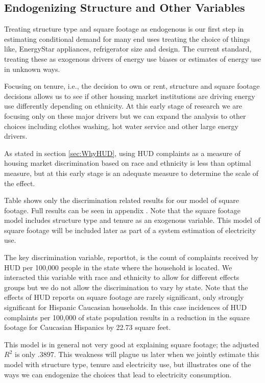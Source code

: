 \documentclass{article}
\begin{document}
\subsection{Endogenizing Structure and Other Variables}\label{sec:SingleEq}

Treating structure type and square footage as endogenous is our first step in estimating conditional demand for many end uses treating the choice of things like, EnergyStar appliances, refrigerator size and design.  The current standard, treating these as exogenous drivers of energy use biases or estimates of energy use in unknown ways.

Focusing on tenure, i.e., the decision to own or rent, structure and square footage decisions allows us to see if other housing market institutions are driving energy use differently depending on ethnicity.  At this early stage of research we are focusing only on these major drivers but we can expand the analysis to other choices including clothes washing, hot water service and other large energy drivers.

As stated in section \ref{sec:WhyHUD}, using HUD complaints as a measure of housing market discrimination based on race and ethnicity is less than optimal measure, but at this early stage is an adequate measure to determine the scale of the effect.  


Table 
shows only the discrimination related results for our model of square footage.  Full results can be seen in appendix 
.   Note that the square footage model includes structure type and tenure as an exogenous variable.  This model of square footage will be included later as part of a system estimation of electricity use.   

The key discrimination variable, reporttot, is the count of complaints received by HUD per 100,000 people in the state where the household is located. We interacted this variable with race and ethnicity to allow for different effects  groups but we do not allow the discrimination to vary by state. Note that the effects of HUD reports on square footage are rarely significant, only strongly significant for Hispanic Caucasian households.  In this case incidences of HUD complaints per 100,000 of state population results in a reduction in the square footage for Caucasian Hispanics by 22.73 square feet.

This model is in general not very good at explaining square footage; the adjusted $R^2$ is only $.3897$.  This weakness will plague us later when we jointly estimate this model with structure type, tenure and electricity use, but illustrates one of the ways we can endogenize the choices that lead to electricity consumption.
\end{document}

